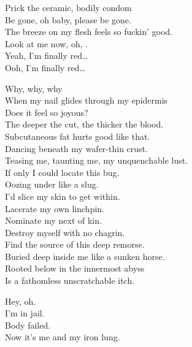 Prick the ceramic, bodily condom \\
Be gone, oh baby, please be gone. \\
The breeze on my flesh feels so fuckin' good. \\
Look at me now, oh, . \\
Yeah, I'm finally red… \\
Ooh, I'm finally red… \\


Why, why, why \\
When my nail glides through my epidermis \\
Does it feel so joyous? \\
The deeper the cut, the thicker the blood. \\
Subcutaneous fat hurts good like that. \\

Dancing beneath my wafer-thin crust. \\
Teasing me, taunting me, my unquenchable lust. \\
If only I could locate this bug. \\
Oozing under like a slug. \\

I'd slice my skin to get within. \\
Lacerate my own linchpin. \\
Nominate my next of kin. \\
Destroy myself with no chagrin. \\

Find the source of this deep remorse. \\
Buried deep inside me like a sunken horse. \\
Rooted below in the innermost abyss \\
Is a fathomless unscratchable itch. \\





Hey, oh. \\
I'm in jail. \\
Body failed. \\
Now it's me and my iron lung. \\


